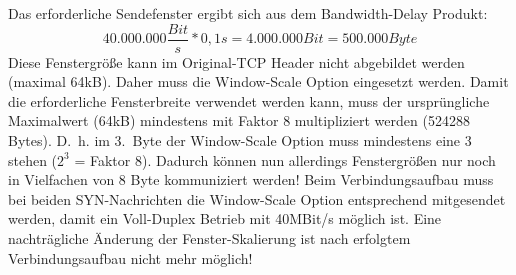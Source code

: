 Das erforderliche Sendefenster ergibt sich aus dem Bandwidth-Delay Produkt:
\[40.000.000 \frac{Bit}{s} * 0,1s = 4.000.000 Bit = 500.000 Byte\]
Diese Fenstergröße kann im Original-TCP Header nicht abgebildet werden (maximal 64kB).
Daher muss die Window-Scale Option eingesetzt werden.
Damit die erforderliche Fensterbreite verwendet werden kann, muss der ursprüngliche Maximalwert (64kB) mindestens mit Faktor 8 multipliziert werden (524288 Bytes).
D.\ h. im 3.\ Byte der Window-Scale Option muss mindestens eine 3 stehen ($2^3$ = Faktor 8).
Dadurch können nun allerdings Fenstergrößen nur noch in Vielfachen
von 8 Byte kommuniziert werden!
Beim Verbindungsaufbau muss bei beiden SYN-Nachrichten die Window-Scale Option entsprechend mitgesendet werden, damit ein Voll-Duplex Betrieb mit 40MBit/s möglich ist.
Eine nachträgliche Änderung der Fenster-Skalierung ist nach erfolgtem Verbindungsaufbau nicht mehr möglich!
